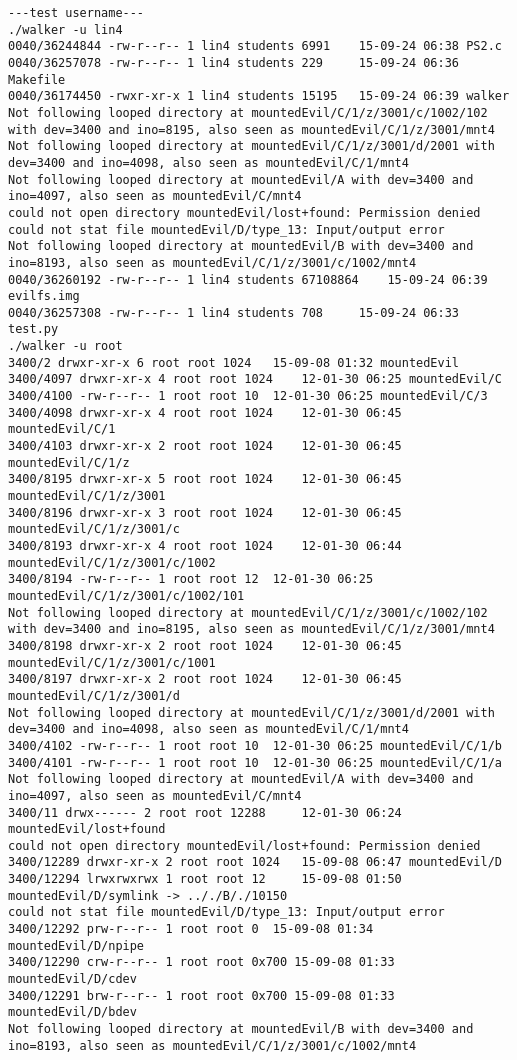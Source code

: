 \documentclass[12pt]{article}
\begin{document}
\begin{lstlisting}
---test username---
./walker -u lin4
0040/36244844 -rw-r--r-- 1 lin4 students 6991	 15-09-24 06:38 PS2.c
0040/36257078 -rw-r--r-- 1 lin4 students 229	 15-09-24 06:36 Makefile
0040/36174450 -rwxr-xr-x 1 lin4 students 15195	 15-09-24 06:39 walker
Not following looped directory at mountedEvil/C/1/z/3001/c/1002/102 with dev=3400 and ino=8195, also seen as mountedEvil/C/1/z/3001/mnt4
Not following looped directory at mountedEvil/C/1/z/3001/d/2001 with dev=3400 and ino=4098, also seen as mountedEvil/C/1/mnt4
Not following looped directory at mountedEvil/A with dev=3400 and ino=4097, also seen as mountedEvil/C/mnt4
could not open directory mountedEvil/lost+found: Permission denied
could not stat file mountedEvil/D/type_13: Input/output error
Not following looped directory at mountedEvil/B with dev=3400 and ino=8193, also seen as mountedEvil/C/1/z/3001/c/1002/mnt4
0040/36260192 -rw-r--r-- 1 lin4 students 67108864	 15-09-24 06:39 evilfs.img
0040/36257308 -rw-r--r-- 1 lin4 students 708	 15-09-24 06:33 test.py
./walker -u root
3400/2 drwxr-xr-x 6 root root 1024	 15-09-08 01:32 mountedEvil
3400/4097 drwxr-xr-x 4 root root 1024	 12-01-30 06:25 mountedEvil/C
3400/4100 -rw-r--r-- 1 root root 10	 12-01-30 06:25 mountedEvil/C/3
3400/4098 drwxr-xr-x 4 root root 1024	 12-01-30 06:45 mountedEvil/C/1
3400/4103 drwxr-xr-x 2 root root 1024	 12-01-30 06:45 mountedEvil/C/1/z
3400/8195 drwxr-xr-x 5 root root 1024	 12-01-30 06:45 mountedEvil/C/1/z/3001
3400/8196 drwxr-xr-x 3 root root 1024	 12-01-30 06:45 mountedEvil/C/1/z/3001/c
3400/8193 drwxr-xr-x 4 root root 1024	 12-01-30 06:44 mountedEvil/C/1/z/3001/c/1002
3400/8194 -rw-r--r-- 1 root root 12	 12-01-30 06:25 mountedEvil/C/1/z/3001/c/1002/101
Not following looped directory at mountedEvil/C/1/z/3001/c/1002/102 with dev=3400 and ino=8195, also seen as mountedEvil/C/1/z/3001/mnt4
3400/8198 drwxr-xr-x 2 root root 1024	 12-01-30 06:45 mountedEvil/C/1/z/3001/c/1001
3400/8197 drwxr-xr-x 2 root root 1024	 12-01-30 06:45 mountedEvil/C/1/z/3001/d
Not following looped directory at mountedEvil/C/1/z/3001/d/2001 with dev=3400 and ino=4098, also seen as mountedEvil/C/1/mnt4
3400/4102 -rw-r--r-- 1 root root 10	 12-01-30 06:25 mountedEvil/C/1/b
3400/4101 -rw-r--r-- 1 root root 10	 12-01-30 06:25 mountedEvil/C/1/a
Not following looped directory at mountedEvil/A with dev=3400 and ino=4097, also seen as mountedEvil/C/mnt4
3400/11 drwx------ 2 root root 12288	 12-01-30 06:24 mountedEvil/lost+found
could not open directory mountedEvil/lost+found: Permission denied
3400/12289 drwxr-xr-x 2 root root 1024	 15-09-08 06:47 mountedEvil/D
3400/12294 lrwxrwxrwx 1 root root 12	 15-09-08 01:50 mountedEvil/D/symlink -> .././B/./10150
could not stat file mountedEvil/D/type_13: Input/output error
3400/12292 prw-r--r-- 1 root root 0	 15-09-08 01:34 mountedEvil/D/npipe
3400/12290 crw-r--r-- 1 root root 0x700 15-09-08 01:33 mountedEvil/D/cdev
3400/12291 brw-r--r-- 1 root root 0x700 15-09-08 01:33 mountedEvil/D/bdev
Not following looped directory at mountedEvil/B with dev=3400 and ino=8193, also seen as mountedEvil/C/1/z/3001/c/1002/mnt4


\end{lstlisting}
\end{document}
